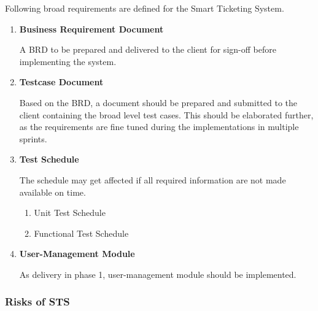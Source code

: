 \documentclass{article}%
\begin{document}
%
\par%
Following broad requirements are defined for the Smart Ticketing System.%
\begin{enumerate}%
\item%
\hypertarget{ID:1929260560}{}%
\textbf{Business Requirement Document}%
%
\par%
A BRD to be prepared and delivered to the client for sign{-}off before implementing the system.%
\item%
\hypertarget{ID:146144158}{}%
\textbf{Testcase Document}%
%
\par%
Based on the BRD, a document should be prepared and submitted to the client containing the broad level test cases. This should be elaborated further, as the requirements are fine tuned during the implementations in multiple sprints.%
\item%
\hypertarget{ID:45116778}{}%
\textbf{Test Schedule}%
%
\par%
\begin{mdframed}[style=StopFrame,skipabove=\baselineskip]%
\small{The schedule may get affected if all required information are not made available on time.}%
\end{mdframed}%
\begin{enumerate}%
\item%
\hypertarget{ID:1970805510}{}%
Unit Test Schedule%
\par%
\item%
\hypertarget{ID:1689608409}{}%
Functional Test Schedule%
\par%
\end{enumerate}%
\item%
\hypertarget{ID:1548505465}{}%
\textbf{User{-}Management Module}%
%
\par%
As delivery in phase 1, user{-}management module should be implemented.%
\end{enumerate}%
\hypertarget{ID:803646838}{}%
\subsubsection{Risks of STS}%
\end{document}
